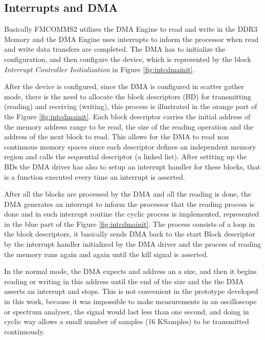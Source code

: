 \subsection{Interrupts and DMA}

Basically FMCOMMS2 utilizes the DMA Engine to read and write in the DDR3 Memory
and the DMA Engine uses interrupts to inform the processor when read and write
data transfers are completed. The DMA has to initialize the configuration, and
then configure the device, which is represented by the block \emph{Interrupt
Controller Initialization} in Figure \ref{fig:intcdmainit}.

After the device is configured, since the DMA is configured in scatter gather
mode, there is the need to allocate the block descriptors (BD) for transmitting
(reading) and receiving (writing), this process is illustrated in the orange
part of the Figure \ref{fig:intcdmainit}. Each block descriptor carries the
initial address of the memory address range to be read, the size of the reading
operation and the address of the next block to read. This allows for the DMA to
read non continuous memory spaces since each descriptor defines an independent
memory region and calls the sequential descriptor (a linked list). After
settting up the BDs the DMA driver has also to setup an interrupt handler for
these blocks, that is a function executed every time an interrupt is asserted.

After all the blocks are processed by the DMA and all the reading is done, the
DMA generates an interrupt to inform the processor that the reading process is
done and in such interrupt routine the cyclic process is implemented,
represented in the blue part of the Figure \ref{fig:intcdmainit}. The process
consists of a loop in the block descriptors, it basically sends DMA back to the
start Block descriptor by the interrupt handler initialized by the DMA driver
and the process of reading the memory runs again and again until the kill signal
is asserted.

In the normal mode, the DMA expects and address an a size, and then it begins
reading or writing in this address until the end of the size and the the DMA
asserts an interrupt and stops. This is not convenient in the prototype
developed in this work, because it was impossible to make measurements in an
oscilloscope or spectrum analyser, the signal would last less than one second,
and doing in cyclic way allows a small number of samples (16 KSamples) to be
transmitted continuously.

